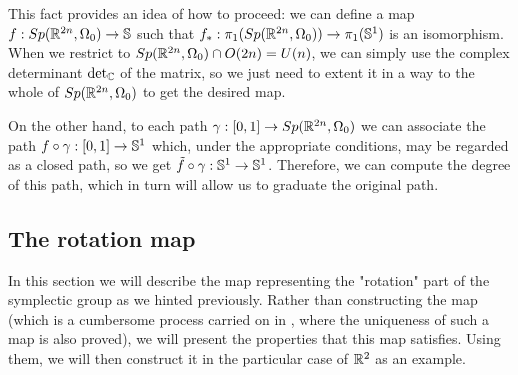 This fact provides an idea of how to proceed: we can define a map $f : Sp(\mathbb{R}^{2n},\Omega_0) \rightarrow \mathbb{S}$ such that $f_{\ast} : \pi_1(Sp(\mathbb{R}^{2n},\Omega_0)) \rightarrow \pi_1(\mathbb{S}^1)$ is an isomorphism. When we restrict to $Sp(\mathbb{R}^{2n},\Omega_0) \cap O(2n) = U(n)$, we can simply use the complex determinant $\text{det}_{\mathbb{C}}$ of the matrix, so we just need to extent it in a way to the whole of $Sp(\mathbb{R}^{2n},\Omega_0)$ to get the desired map.

On the other hand, to each path $\gamma : [0,1] \rightarrow Sp(\mathbb{R}^{2n},\Omega_0)$ we can associate the path $f \circ \gamma : [0,1] \rightarrow \mathbb{S}^1$ which, under the appropriate conditions, may be regarded as a closed path, so we get $\tilde{f} \circ \gamma : \mathbb{S}^1 \rightarrow \mathbb{S}^1$. Therefore, we can compute the degree of this path, which in turn will allow us to graduate the original path.

\subsection{The rotation map}

In this section we will describe the map representing the "rotation" part of the symplectic group as we hinted previously. Rather than constructing the map (which is a cumbersome process carried on in \cite{gutt2012conley}, where the uniqueness of such a map is also proved), we will present the properties that this map satisfies. Using them, we will then construct it in the particular case of $\mathbb{R}^2$ as an example.

